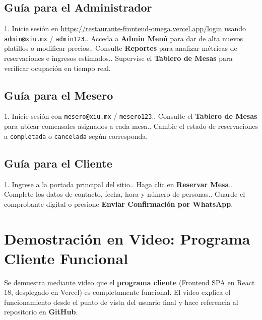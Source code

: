 \documentclass[12pt,a4paper]{article}
\begin{document}
\subsection{Guía para el Administrador}
1. Inicie sesión en \url{https://restaurante-frontend-omega.vercel.app/login} usando \texttt{admin@xiu.mx} / \texttt{admin123}.. Acceda a \textbf{Admin Menú} para dar de alta nuevos platillos o modificar precios.. Consulte \textbf{Reportes} para analizar métricas de reservaciones e ingresos estimados.. Supervise el \textbf{Tablero de Mesas} para verificar ocupación en tiempo real.

\subsection{Guía para el Mesero}
1. Inicie sesión con \texttt{mesero@xiu.mx} / \texttt{mesero123}.. Consulte el \textbf{Tablero de Mesas} para ubicar comensales asignados a cada mesa.. Cambie el estado de reservaciones a \texttt{completada} o \texttt{cancelada} según corresponda.

\subsection{Guía para el Cliente}
1. Ingrese a la portada principal del sitio.. Haga clic en \textbf{Reservar Mesa}.. Complete los datos de contacto, fecha, hora y número de personas.. Guarde el comprobante digital o presione \textbf{Enviar Confirmación por WhatsApp}.


\section{Demostración en Video: Programa Cliente Funcional}

\begin{tcolorbox}[title=Criterio de Evaluación --- Punto 9: El programa cliente es funcional (15 pts)]
Se demuestra mediante video que el \textbf{programa cliente} (Frontend SPA en React 18, desplegado en Vercel) es completamente funcional.
El video explica el funcionamiento desde el punto de vista del usuario final y hace referencia al repositorio en \textbf{GitHub}.
\end{tcolorbox}
\end{document}
